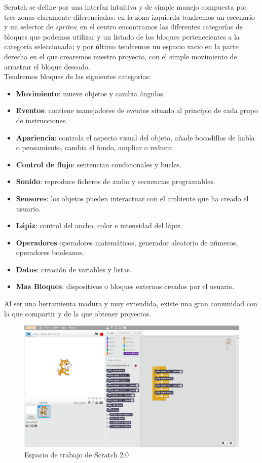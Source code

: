 Scratch se define por una interfaz intuitiva y de simple manejo compuesta por tres zonas claramente diferenciadas: en la zona izquierda tendremos un escenario y un selector de \textit{sprites}; en el centro encontramos las diferentes categorías de bloques que podemos utilizar y un listado de los bloques pertenecientes a la categoría seleccionada; y por último tendremos un espacio vacio en la parte derecha en el que crearemos nuestro proyecto, con el simple movimiento de arrastrar el bloque deseado.\\

Tendremos bloques de las siguientes categorías:
\begin{itemize}
\item \textbf{Movimiento}: mueve objetos y cambia ángulos.	  	 	
\item \textbf{Eventos}: contiene manejadores de eventos situado al principio de cada grupo de instrucciones.
\item \textbf{Apariencia}: controla el aspecto visual del objeto, añade bocadillos de habla o 
pensamiento, cambia el fondo, ampliar o reducir.	 	
\item \textbf{Control de flujo}: sentencian condicionales y bucles. 
\item \textbf{Sonido}: reproduce ficheros de audio y secuencias programables.	 	
\item \textbf{Sensores}: los objetos pueden interactuar con el ambiente que ha creado el usuario.
\item \textbf{Lápiz}: control del ancho, color e intensidad del lápiz.	 	
\item \textbf{Operadores} operadores matemáticos, generador aleatorio de números, operadores booleanos.
\item \textbf{Datos}: creación de variables y listas.	 	
\item \textbf{Mas Bloques}: dispositivos o bloques externos creados por el usuario.
\end{itemize}

Al ser una herramienta madura y muy extendida, existe una gran comunidad con la que compartir y de la que obtener proyectos.

\begin{figure}[H]
    \centering
    \includegraphics[scale=0.32]{img/scratch_IDE.png}
  	\caption{Espacio de trabajo de Scratch 2.0}
  	\label{fig:gazebo}
\end{figure}


